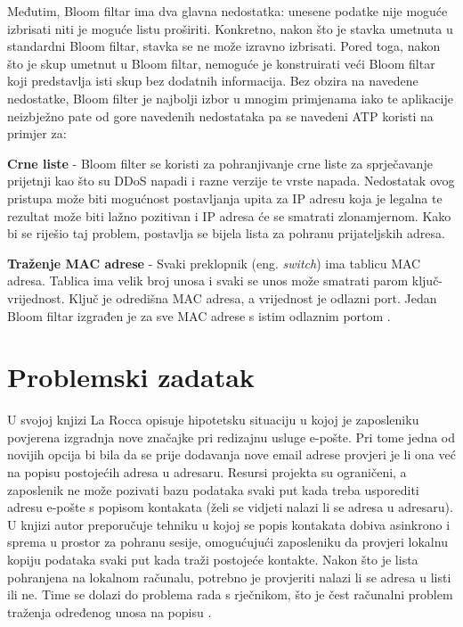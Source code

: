 \documentclass{foi}
\begin{document}
Međutim, Bloom filtar ima dva glavna nedostatka: unesene podatke nije moguće izbrisati niti je moguće listu proširiti. Konkretno, nakon što je stavka umetnuta u standardni Bloom filtar, stavka se ne može izravno izbrisati. Pored toga, nakon što je skup umetnut u Bloom filtar, nemoguće je konstruirati veći Bloom filtar koji predstavlja isti skup bez dodatnih informacija. Bez obzira na navedene nedostatke, Bloom filter je najbolji izbor u mnogim primjenama iako te aplikacije neizbježno pate od gore navedenih nedostataka pa se navedeni ATP koristi na primjer za:

\textbf{Crne liste} - Bloom filter se koristi za pohranjivanje crne liste za sprječavanje prijetnji kao što su DDoS napadi i razne verzije te vrste napada. Nedostatak ovog pristupa može biti mogućnost postavljanja upita za IP adresu koja je legalna te rezultat može biti lažno pozitivan i IP adresa će se smatrati zlonamjernom. Kako bi se riješio taj problem, postavlja se bijela lista za pohranu prijateljskih adresa.

\textbf{Traženje MAC adrese} - Svaki preklopnik (eng. \textit{switch}) ima tablicu MAC adresa. Tablica ima velik broj unosa i svaki se unos može smatrati parom ključ-vrijednost. Ključ je odredišna MAC adresa, a vrijednost je odlazni port. Jedan Bloom filtar izgrađen je za sve MAC adrese s istim odlaznim portom  \cite{wu2021elastic}.


\section{Problemski zadatak}
U svojoj knjizi La Rocca opisuje hipotetsku situaciju u kojoj je zaposleniku povjerena izgradnja nove značajke pri redizajnu usluge e-pošte. Pri tome jedna od novijih opcija bi bila da se prije dodavanja nove email adrese provjeri je li ona već na popisu postojećih adresa u adresaru. Resursi projekta su ograničeni, a zaposlenik ne može pozivati bazu podataka svaki put kada treba usporediti adresu e-pošte s popisom kontakata (želi se vidjeti nalazi li se adresa u adresaru). U knjizi autor preporučuje tehniku u kojoj se popis kontakata dobiva asinkrono i sprema u prostor za pohranu sesije, omogućujući zaposleniku da provjeri lokalnu kopiju podataka svaki put kada traži postojeće kontakte. Nakon što je lista pohranjena na lokalnom računalu, potrebno je provjeriti nalazi li se adresa u listi ili ne. Time se dolazi do problema rada s rječnikom, što je čest računalni problem traženja određenog unosa na popisu \cite{la2021advanced}.
\end{document}
